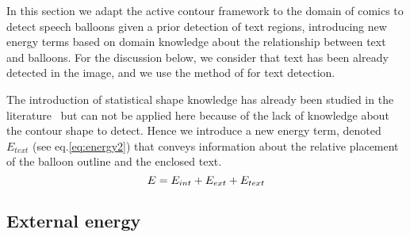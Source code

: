 \documentclass[conference]{IEEEtran}
\begin{document}

In this section we adapt the active contour framework to the domain of comics to detect speech balloons given a prior detection of text regions, introducing new energy terms based on domain knowledge about the relationship between text and balloons. For the discussion below, we consider that text has been already detected in the image, and we use the method of \cite{Rigaud2013VISAPP} for text detection.

The introduction of statistical shape knowledge has already been studied in the literature~\cite{Cremers2002} but can not be applied here because of the lack of knowledge about the contour shape to detect. Hence we introduce a new energy term, denoted $E_{text}$ (see eq.\ref{eq:energy2}) that conveys information about the relative placement of the balloon outline and the enclosed text.
\begin{equation}\label{eq:energy2}
  E = E_{int} + E_{ext} + E_{text}\\
\end{equation}
\subsection{External energy}
\label{sec:external_energie}
\end{document}
